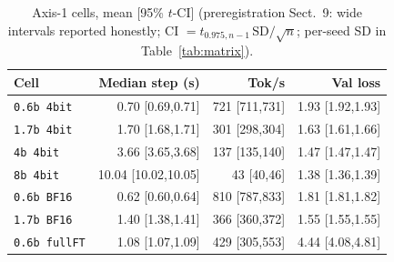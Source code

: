 \begin{table}[t]\centering
\caption{Axis-1 cells, mean [95\% $t$-CI] (preregistration Sect.~9: wide intervals reported honestly; CI $= t_{0.975,n-1}\,\mathrm{SD}/\sqrt{n}$; per-seed SD in Table~\ref{tab:matrix}).}
\label{tab:ci}
\footnotesize\setlength{\tabcolsep}{3pt}
\begin{tabular}{lrrr}
\toprule
Cell & Median step (s) & Tok/s & Val loss\\
\midrule
\texttt{0.6b 4bit} & 0.70 [0.69,0.71] & 721 [711,731] & 1.93 [1.92,1.93]\\
\texttt{1.7b 4bit} & 1.70 [1.68,1.71] & 301 [298,304] & 1.63 [1.61,1.66]\\
\texttt{4b 4bit} & 3.66 [3.65,3.68] & 137 [135,140] & 1.47 [1.47,1.47]\\
\texttt{8b 4bit} & 10.04 [10.02,10.05] & 43 [40,46] & 1.38 [1.36,1.39]\\
\texttt{0.6b BF16} & 0.62 [0.60,0.64] & 810 [787,833] & 1.81 [1.81,1.82]\\
\texttt{1.7b BF16} & 1.40 [1.38,1.41] & 366 [360,372] & 1.55 [1.55,1.55]\\
\texttt{0.6b fullFT} & 1.08 [1.07,1.09] & 429 [305,553] & 4.44 [4.08,4.81]\\
\bottomrule
\end{tabular}
\end{table}
